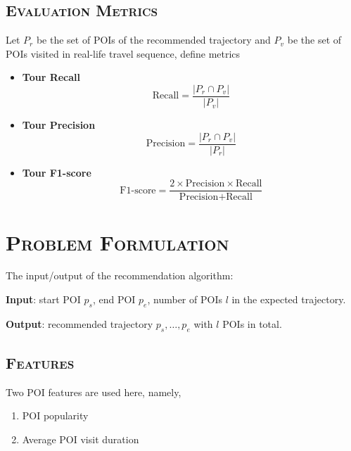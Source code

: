 \documentclass[11pt, a4paper]{article}
\begin{document}
\subsection{\textsc{Evaluation Metrics}} 
Let $P_r$ be the set of POIs of the recommended trajectory and $P_v$ be the set of POIs visited in real-life travel sequence,
define metrics\cite{lim15}
\begin{itemize}
\item \textbf{Tour Recall}
      \begin{equation*}
      \text{Recall} = \frac{\lvert P_r \cap P_v \rvert}{\lvert P_v \rvert}
      \end{equation*}
\item \textbf{Tour Precision}
      \begin{equation*}
      \text{Precision} = \frac{\lvert P_r \cap P_v \rvert}{\lvert P_r \rvert}
      \end{equation*}
\item \textbf{Tour F1-score}
      \begin{equation*}
      \text{F1-score} = \frac{2 \times \text{Precision} \times \text{Recall}}{\text{Precision} + \text{Recall}}
      \end{equation*}
\end{itemize}


\section{\textsc{Problem Formulation}}
\label{sec:formulation}
The input/output of the recommendation algorithm:
\begin{description}
\item \textbf{Input}: start POI $p_s$, end POI $p_e$, number of POIs $l$ in the expected trajectory.
\item \textbf{Output}: recommended trajectory $p_s, \dots, p_e$ with $l$ POIs in total.
\end{description}

\subsection{\textsc{Features}}
Two POI features are used here, namely,
\begin{enumerate}
\item POI popularity
\item Average POI visit duration
\end{enumerate}
\end{document}
